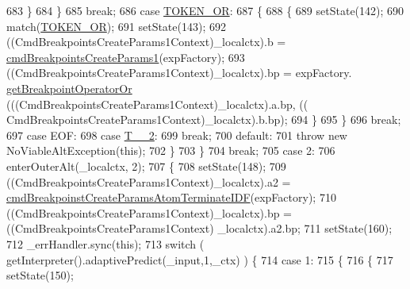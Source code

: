 \begin{DoxyCode}
683           \}
684           \}
685           \textcolor{keywordflow}{break};
686         \textcolor{keywordflow}{case} \hyperlink{classgov_1_1nasa_1_1jpf_1_1inspector_1_1server_1_1expression_1_1parser_1_1_expression_grammar_parser_a58d1da7a1e088d5c9ec31125f10322dd}{TOKEN\_OR}:
687           \{
688           \{
689           setState(142);
690           match(\hyperlink{classgov_1_1nasa_1_1jpf_1_1inspector_1_1server_1_1expression_1_1parser_1_1_expression_grammar_parser_a58d1da7a1e088d5c9ec31125f10322dd}{TOKEN\_OR});
691           setState(143);
692           ((CmdBreakpointsCreateParams1Context)\_localctx).b = 
      \hyperlink{classgov_1_1nasa_1_1jpf_1_1inspector_1_1server_1_1expression_1_1parser_1_1_expression_grammar_parser_aa16584e37b631f4c0cdd1b148deda9df}{cmdBreakpointsCreateParams1}(expFactory);
693            ((CmdBreakpointsCreateParams1Context)\_localctx).bp =  expFactory.
      \hyperlink{classgov_1_1nasa_1_1jpf_1_1inspector_1_1server_1_1expression_1_1_expression_factory_a3fe75976271f06e318517aaa94809470}{getBreakpointOperatorOr} (((CmdBreakpointsCreateParams1Context)\_localctx).a.bp, ((
      CmdBreakpointsCreateParams1Context)\_localctx).b.bp); 
694           \}
695           \}
696           \textcolor{keywordflow}{break};
697         \textcolor{keywordflow}{case} EOF:
698         \textcolor{keywordflow}{case} \hyperlink{classgov_1_1nasa_1_1jpf_1_1inspector_1_1server_1_1expression_1_1parser_1_1_expression_grammar_parser_afad4c6ad364a1969b2f65bf00345f6bf}{T\_\_2}:
699           \textcolor{keywordflow}{break};
700         \textcolor{keywordflow}{default}:
701           \textcolor{keywordflow}{throw} \textcolor{keyword}{new} NoViableAltException(\textcolor{keyword}{this});
702         \}
703         \}
704         \textcolor{keywordflow}{break};
705       \textcolor{keywordflow}{case} 2:
706         enterOuterAlt(\_localctx, 2);
707         \{
708         setState(148);
709         ((CmdBreakpointsCreateParams1Context)\_localctx).a2 = 
      \hyperlink{classgov_1_1nasa_1_1jpf_1_1inspector_1_1server_1_1expression_1_1parser_1_1_expression_grammar_parser_a67979d89277e44ddae7fa8ab4a4d8cfb}{cmdBreakpoinstCreateParamsAtomTerminateIDF}(expFactory);
710         ((CmdBreakpointsCreateParams1Context)\_localctx).bp =  ((CmdBreakpointsCreateParams1Context)
      \_localctx).a2.bp; 
711         setState(160);
712         \_errHandler.sync(\textcolor{keyword}{this});
713         \textcolor{keywordflow}{switch} ( getInterpreter().adaptivePredict(\_input,1,\_ctx) ) \{
714         \textcolor{keywordflow}{case} 1:
715           \{
716           \{
717           setState(150);

\end{DoxyCode}
